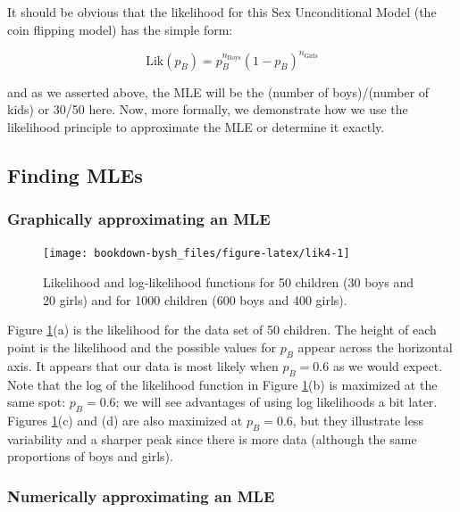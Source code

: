 \documentclass[
]{krantz}
\newcommand{\lik}{\mathrm{Lik}}
\begin{document}
It should be obvious that the likelihood for this Sex Unconditional Model (the coin flipping model) has the simple form:

\begin{equation*}
\lik(p_B) = p_B^{n_\textrm{Boys}}(1-p_B)^{n_\textrm{Girls}}
\end{equation*}

and as we asserted above, the MLE will be the (number of boys)/(number of kids) or 30/50 here. Now, more formally, we demonstrate how we use the likelihood principle to approximate the MLE or determine it exactly.

\hypertarget{findMLE.sec}{%
\subsection{Finding MLEs}\label{findMLE.sec}}

\hypertarget{MLEgph.sec}{%
\subsubsection{Graphically approximating an MLE}\label{MLEgph.sec}}

\begin{figure}

{\centering \texttt{[image: bookdown-bysh\_files/figure-latex/lik4-1]} 

}

\caption{Likelihood and log-likelihood functions for 50 children (30 boys and 20 girls) and for 1000 children (600 boys and 400 girls).}\label{fig:lik4}
\end{figure}

Figure \ref{fig:lik4}(a) is the likelihood for the data set of 50 children. The height of each point is the likelihood and the possible values for \(p_B\) appear across the horizontal axis. It appears that our data is most likely when \(p_B = 0.6\) as we would expect. Note that the log of the likelihood function in Figure \ref{fig:lik4}(b) is maximized at the same spot: \(p_B = 0.6\); we will see advantages of using log likelihoods a bit later. Figures \ref{fig:lik4}(c) and (d) are also maximized at \(p_B = 0.6\), but they illustrate less variability and a sharper peak since there is more data (although the same proportions of boys and girls).

\hypertarget{numerically-approximating-an-mle}{%
\subsubsection{Numerically approximating an MLE}\label{numerically-approximating-an-mle}}
\end{document}
